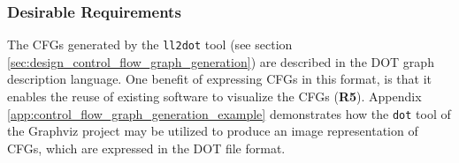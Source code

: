 
\subsubsection{Desirable Requirements}
\label{sec:eval_llvm_ir_library_desirable_requirements}


The CFGs generated by the \texttt{ll2dot} tool (see section \ref{sec:design_control_flow_graph_generation}) are described in the DOT graph description language. One benefit of expressing CFGs in this format, is that it enables the reuse of existing software to visualize the CFGs (\textbf{R5}). Appendix \ref{app:control_flow_graph_generation_example} demonstrates how the \texttt{dot} tool of the Graphviz project may be utilized to produce an image representation of CFGs, which are expressed in the DOT file format.
